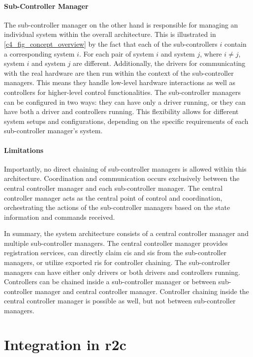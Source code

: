 \paragraph{Sub-Controller Manager}
The sub-controller manager on the other hand is responsible for managing an individual system within the overall architecture. This is illustrated in \autoref{c4_fig_concept_overview} by the fact that each of the sub-controllers $i$ contain a corresponding system $i$. For each pair of system $i$ and system $j$, where $i\neq j$, system $i$ and system $j$ are different.\newline
Additionally, the drivers for communicating with the real hardware are then run within the context of the sub-controller managers. This means they handle low-level hardware interactions as well as controllers for higher-level control functionalities.\newline
The sub-controller managers can be configured in two ways: they can have only a driver running, or they can have both a driver and controllers running. This flexibility allows for different system setups and configurations, depending on the specific requirements of each sub-controller manager's system.
\paragraph{Limitations}
Importantly, no direct chaining of sub-controller managers is allowed within this architecture. Coordination and communication occurs exclusively between the central controller manager and each sub-controller manager. The central controller manager acts as the central point of control and coordination, orchestrating the actions of the sub-controller managers based on the state information and commands received.

In summary, the system architecture consists of a central controller manager and multiple sub-controller managers. The central controller manager provides registration services, can directly claim \glspl{ci} and \glspl{si} from the sub-controller managers, or utilize exported \glspl{ri} for controller chaining. The sub-controller managers can have either only drivers or both drivers and controllers running. Controllers can be chained inside a sub-controller manager or between sub-controller manager and central controller manager. Controller chaining inside the central controller manager is possible as well, but not between sub-controller managers.


\section{Integration in \gls{r2c}}
